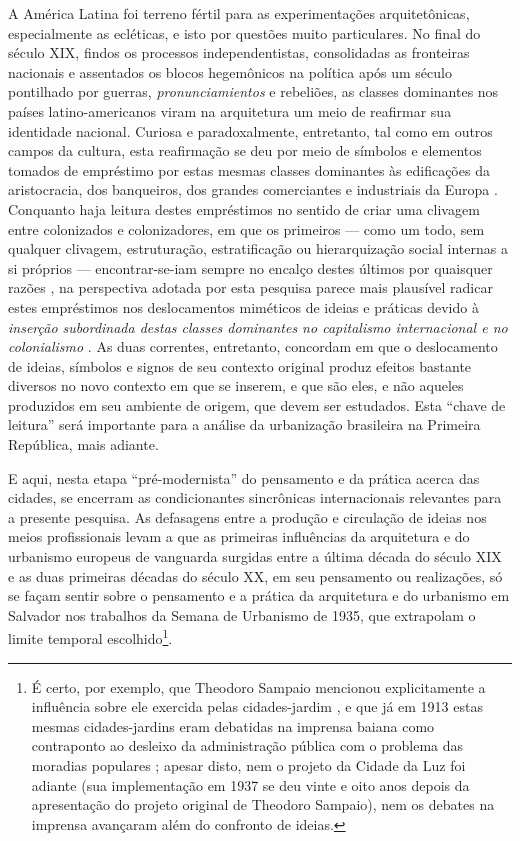 A América Latina foi terreno fértil para as experimentações arquitetônicas, especialmente as ecléticas, e isto por questões muito particulares. No final do século XIX, findos os processos independentistas, consolidadas as fronteiras nacionais e assentados os blocos hegemônicos na política após um século pontilhado por guerras, \textit{pronunciamientos} e rebeliões, as classes dominantes nos países latino-americanos viram na arquitetura um meio de reafirmar sua identidade nacional. Curiosa e paradoxalmente, entretanto, tal como em outros campos da cultura, esta reafirmação se deu por meio de símbolos e elementos tomados de empréstimo por estas mesmas classes dominantes às edificações da aristocracia, dos banqueiros, dos grandes comerciantes e industriais da Europa \cite[pp.~403-406]{gutierrez_arquibero_1983}. Conquanto haja leitura destes empréstimos no sentido de criar uma clivagem entre colonizados e colonizadores, em que os primeiros --- como um todo, sem qualquer clivagem, estruturação, estratificação ou hierarquização social internas a si próprios --- encontrar-se-iam sempre no encalço destes últimos por quaisquer razões \cite{bhabha_local_1998,memmi_coloniza_1967}, na perspectiva adotada por esta pesquisa parece mais plausível radicar estes empréstimos nos deslocamentos miméticos de ideias e práticas devido à \textit{inserção subordinada destas classes dominantes no capitalismo internacional e no colonialismo} \cite{schwarz_ideias_1973}. As duas correntes, entretanto, concordam em que o deslocamento de ideias, símbolos e signos de seu contexto original produz efeitos bastante diversos no novo contexto em que se inserem, e que são eles, e não aqueles produzidos em seu ambiente de origem, que devem ser estudados. Esta ``chave de leitura'' será importante para a análise da urbanização brasileira na Primeira República, mais adiante.

E aqui, nesta etapa ``pré-modernista'' do pensamento e da prática acerca das cidades, se encerram as condicionantes sincrônicas internacionais relevantes para a presente pesquisa. As defasagens entre a produção e circulação de ideias nos meios profissionais levam a que as primeiras influências da arquitetura e do urbanismo europeus de vanguarda surgidas entre a última década do século XIX e as duas primeiras décadas do século XX, em seu pensamento ou realizações, só se façam sentir sobre o pensamento e a prática da arquitetura e do urbanismo em Salvador nos trabalhos da Semana de Urbanismo de 1935, que extrapolam o limite temporal escolhido\footnote{É certo, por exemplo, que Theodoro Sampaio mencionou explicitamente a influência sobre ele exercida pelas cidades-jardim \cite{costa1996theodoro}, e que já em 1913 estas mesmas cidades-jardins eram debatidas na imprensa baiana como contraponto ao desleixo da administração pública com o problema das moradias populares \cite{flexor_salvadorverde_2000}; apesar disto, nem o projeto da Cidade da Luz foi adiante (sua implementação em 1937 se deu vinte e oito anos depois da apresentação do projeto original de Theodoro Sampaio), nem os debates na imprensa avançaram além do confronto de ideias.}.